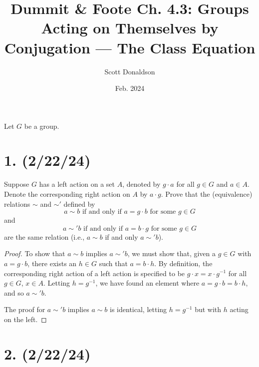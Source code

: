 \documentclass{article}
\title{Dummit \& Foote Ch. 4.3: Groups Acting on Themselves by Conjugation — The Class Equation}
\author{Scott Donaldson}
\date{Feb. 2024}
\begin{document}
\maketitle

Let $G$ be a group.

\section*{1. (2/22/24)}

Suppose $G$ has a left action on a set $A$, denoted by $g \cdot a$ for all $g \in G$ and $a \in A$. Denote the corresponding right action on $A$ by $a \cdot g$. Prove that the (equivalence) relations $\sim$ and $\sim'$ defined by
\begin{equation*}
    a \sim b \text{ if and only if } a = g \cdot b \text{ for some } g \in G
\end{equation*}
and
\begin{equation*}
    a \sim' b \text{ if and only if } a = b \cdot g \text{ for some } g \in G
\end{equation*}
are the same relation (i.e., $a \sim b$ if and only $a \sim' b$).

\begin{proof}
    To show that $a \sim b$ implies $a \sim' b$, we must show that, given a $g \in G$ with $a = g \cdot b$, there exists an $h \in G$ such that $a = b \cdot h$. By definition, the corresponding right action of a left action is specified to be $g \cdot x = x \cdot g^{-1}$ for all $g \in G$, $x \in A$. Letting $h = g^{-1}$, we have found an element where $a = g \cdot b = b \cdot h$, and so $a \sim' b$.

    The proof for $a \sim' b$ implies $a \sim b$ is identical, letting $h = g^{-1}$ but with $h$ acting on the left.
\end{proof}

\section*{2. (2/22/24)}
\end{document}
